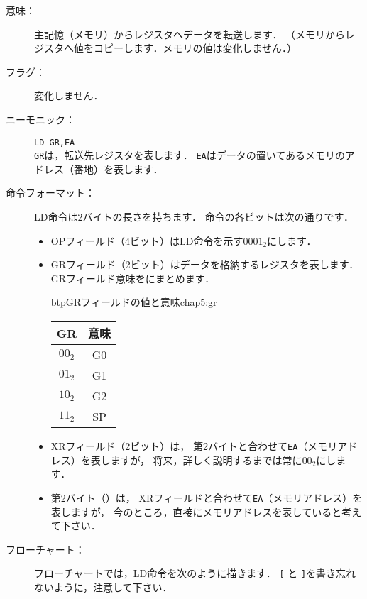 \begin{description}
\item[意味：]主記憶（メモリ）からレジスタへデータを転送します．
（メモリからレジスタへ値をコピーします．メモリの値は変化しません．） 

\item[フラグ：]変化しません．

\item[ニーモニック：]{\tt LD  GR,EA} \\
{\tt GR}は，転送先レジスタを表します．
{\tt EA}はデータの置いてあるメモリのアドレス（番地）を表します．

\item[命令フォーマット：]LD命令は2バイトの長さを持ちます．
命令の各ビットは次の通りです．


\begin{itemize}
\item OPフィールド（4ビット）はLD命令を示す$0001_2$にします．
\item GRフィールド（2ビット）はデータを格納するレジスタを表します．
GRフィールド意味をにまとめます．

\begin{mytable}{btp}{GRフィールドの値と意味}{chap5:gr}
{\small\begin{center}
\begin{tabular}{c|c} \hline\hline
 GR & 意味 \\
\hline
$00_2$ & G0 \\
$01_2$ & G1 \\
$10_2$ & G2 \\
$11_2$ & SP \\
\end{tabular}
\end{center}}
\end{mytable}

\item XRフィールド（2ビット）は，
第2バイトと合わせて{\tt EA}（メモリアドレス）を表しますが，
将来，詳しく説明するまでは常に$00_2$にします．

\item 第2バイト（\A）は，
XRフィールドと合わせて{\tt EA}（メモリアドレス）を表しますが，
今のところ，直接にメモリアドレスを表していると考えて下さい．
\end{itemize}

\item[フローチャート：]フローチャートでは，LD命令を次のように描きます．
{\tt [} と {\tt ]}を書き忘れないように，注意して下さい．


\end{description}
